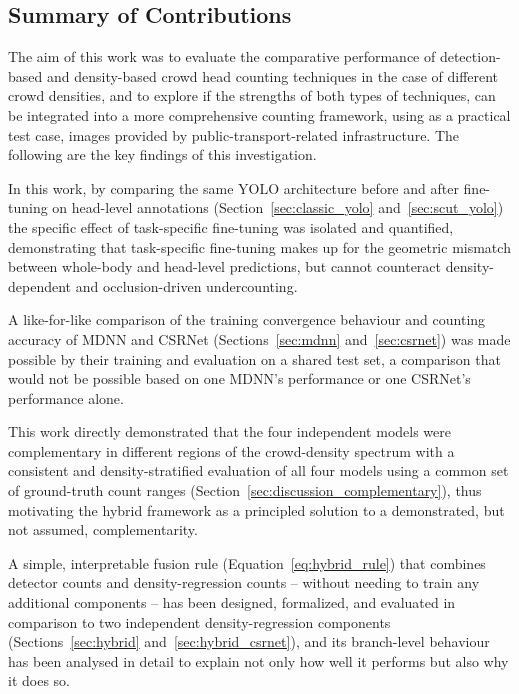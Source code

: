 \label{chap:conclusion}

\subsection{Summary of Contributions}
\label{sec:conclusion_contributions}

The aim of this work was to evaluate the comparative performance of detection-based and density-based crowd head counting techniques in the case of different crowd densities, and to explore if the strengths of both types of techniques, can be integrated into a more comprehensive counting framework, using as a practical test case, images provided by public-transport-related infrastructure. The following are the key findings of this investigation.


In this work, by comparing the same YOLO architecture before and after fine-tuning on head-level annotations (Section~\ref{sec:classic_yolo} and~\ref{sec:scut_yolo}) the specific effect of task-specific fine-tuning was isolated and quantified, demonstrating that task-specific fine-tuning makes up for the geometric mismatch between whole-body and head-level predictions, but cannot counteract density-dependent and occlusion-driven undercounting.

A like-for-like comparison of the training convergence behaviour and counting accuracy of MDNN and CSRNet (Sections~\ref{sec:mdnn} and~\ref{sec:csrnet}) was made possible by their training and evaluation on a shared test set, a comparison that would not be possible based on one MDNN's performance or one CSRNet's performance alone.

This work directly demonstrated that the four independent models were complementary in different regions of the crowd-density spectrum with a consistent and density-stratified evaluation of all four models using a common set of ground-truth count ranges (Section~\ref{sec:discussion_complementary}), thus motivating the hybrid framework as a principled solution to a demonstrated, but not assumed, complementarity.

A simple, interpretable fusion rule (Equation~\ref{eq:hybrid_rule}) that combines detector counts and density-regression counts -- without needing to train any additional components -- has been designed, formalized, and evaluated in comparison to two independent density-regression components (Sections~\ref{sec:hybrid} and~\ref{sec:hybrid_csrnet}), and its branch-level behaviour has been analysed in detail to explain not only how well it performs but also why it does so.

